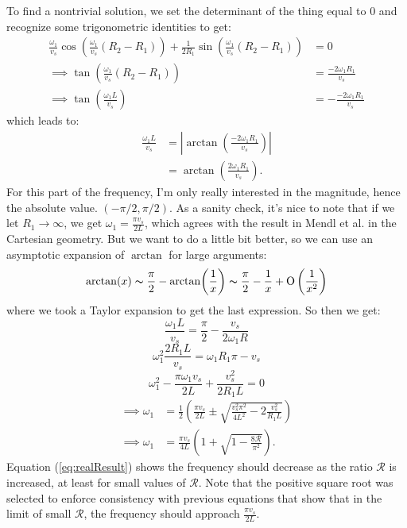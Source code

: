 \documentclass[12pt]{article}
\begin{document}
 	To find a nontrivial solution, we set the determinant of the thing equal to $0$ and recognize some trigonometric identities to get:
 	\begin{align}
 	\frac{\omega_1}{v_s}\cos\left( \frac{\omega_1}{v_s} (R_2 - R_1)\right) + \frac{1}{2R_1}\sin\left(\frac{\omega_1}{v_s} (R_2 - R_1) \right) &= 0 \nonumber \\
 	\implies  \tan\left( \frac{\omega_1}{v_s} (R_2 - R_1) \right) &= \frac{-2 \omega_1R_1}{v_s} \nonumber \\
 	\implies \tan \left( \frac{\omega_1 L}{v_s}\right) &= -\frac{-2 \omega_1 R_1}{v_s} \nonumber
 	\end{align}
 	which leads to:
 	\begin{align*}
 	\frac{\omega_1 L }{v_s} &= \left|\arctan(\frac{-2 \omega_1 R_1}{v_s})\right| \\
 	&= \arctan(\frac{2 \omega_1 R_1}{v_s}).
 	\end{align*}
 	For this part of the frequency, I'm only really interested in the magnitude, hence the absolute value. $(-\pi/2, \pi / 2)$. As a sanity check, it's nice to note that if we let $R_1 \rightarrow \infty$, we get $\omega_1 = \frac{\pi v_s}{2L}$, which agrees with the result in Mendl et al. in the Cartesian geometry.  But we want to do a little bit better, so we can use an asymptotic expansion of $\arctan$ for large arguments:
 	\[\arctan(x) \thicksim \frac{\pi}{2} - \arctan(\frac{1}{x}) \thicksim \frac{\pi}{2} - \frac{1}{x} + \mathrm{O} \left( \frac{1}{x^2} \right) \]
 	where we took a Taylor expansion to get the last expression. So then we get:
 	\[ \frac{\omega_1L}{v_s} = \frac{\pi}{2} - \frac{v_s}{2 \omega_1R} \]
 	\[ \omega_1^2 \frac{2 R_1L}{v_s} = \omega_1 R_1 \pi - v_s \]
 	\[ \omega_1^2 - \frac{\pi \omega_1v_s}{2 L} + \frac{v_s^2}{2 R_1 L} = 0\]
 	\begin{align}
 	\label{eq:realResult}
	\implies \omega_1 &= \frac{1}{2}\left( \frac{\pi v_s}{2L} \pm \sqrt{\frac{v_s^2 \pi^2}{4L^2} - 2 \frac{v_s^2}{R_1 L}}\right) \nonumber \\
	\implies \omega_1 &= \frac{\pi v_s}{4 L}\left(1 +  \sqrt{1 - \frac{8 \mathcal{R}}{\pi ^ 2}} \right). 
 	\end{align}
 	Equation (\ref{eq:realResult}) shows the frequency should decrease as the ratio $\mathcal{R}$ is increased, at least for small values of $\mathcal{R}$.  Note that the positive square root was selected to enforce consistency with previous equations that show that in the limit of small $\mathcal{R}$, the frequency should approach $\frac{\pi v_s}{2L}$.
 	
\end{document}
